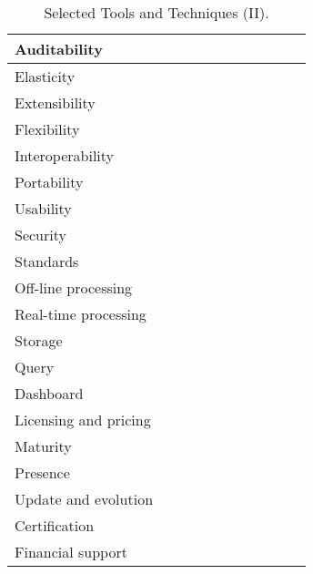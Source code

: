 \begin{sidewaystable}[!ht]
\begin{center}
\begin{tabular}[c]{|p{1.7cm}|p{1.5cm}|p{1.5cm}|p{1.5cm}|p{1.5cm}|p{1.5cm}|p{1.5cm}|p{1.5cm}|p{1.5cm}|p{1.5cm}|p{1.5cm}|}
  Auditability &  &   &  &  &  &  &  &  &  & \\ \hline  
  Elasticity &  &   &  &  &  &  &  &  &  & \\ \hline  
  Extensibility &  &   &  &  &  &  &  &  &  & \\ \hline  
  Flexibility &  &   &  &  &  &  &  &  &  & \\ \hline  
  Interoperability &  &   &  &  &  &  &  &  &  & \\ \hline  
  Portability &  &   &  &  &  &  &  &  &  & \\ \hline  
  Usability &  &   &  &  &  &  &  &  &  & \\ \hline  
  Security &  &   &  &  &  &  &  &  &  & \\ \hline  
  Standards &  &   &  &  &  &  &  &  &  & \\ \hline  
  Off-line processing &  &   &  &  &  &  &  &  &  & \\ \hline  
  Real-time processing &  &   &  &  &  &  &  &  &  & \\ \hline  
  Storage &  &   &  &  &  &  &  &  &  & \\ \hline  
  Query &  &   &  &  &  &  &  &  &  & \\ \hline  
  Dashboard &  &   &  &  &  &  &  &  &  & \\ \hline  
  Licensing and pricing &  &   &  &  &  &  &  &  &  & \\ \hline  
  Maturity &  &   &  &  &  &  &  &  &  & \\ \hline  
  Presence &  &   &  &  &  &  &  &  &  & \\ \hline  
  Update and evolution &  &   &  &  &  &  &  &  &  & \\ \hline  
  Certification &  &   &  &  &  &  &  &  &  & \\ \hline  
  Financial support &  &   &  &  &  &  &  &  &  & \\ \hline  

\hline
\end{tabular}
\caption{Selected Tools and Techniques (II).}\label{table:tools-ii}
  \end{center}
\end{sidewaystable} 

